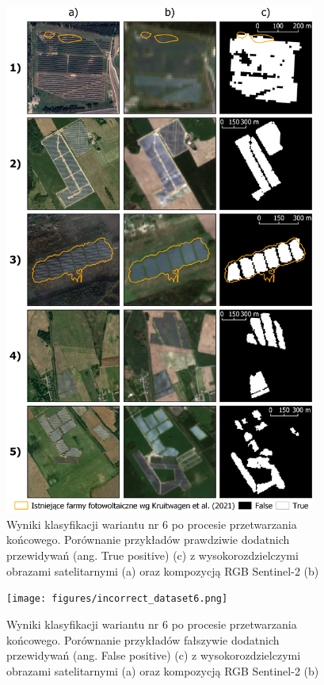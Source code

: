 \documentclass{amuthesis}
\begin{document}
\begin{figure}[t]

{\centering \includegraphics[width=0.91\textwidth,height=\textheight]{figures/pv_dataset6.png}

}

\caption{\label{fig-rycina-truepositive-dataset6}Wyniki klasyfikacji
wariantu nr 6 po procesie przetwarzania końcowego. Porównanie przykładów
prawdziwie dodatnich przewidywań (ang. True positive) (c) z
wysokorozdzielczymi obrazami satelitarnymi (a) oraz kompozycją RGB
Sentinel-2 (b)}

\end{figure}

\begin{figure}[t]

{\centering \texttt{[image: figures/incorrect\_dataset6.png]}

}

\caption{\label{fig-rycina-falsepositive-dataset6}Wyniki klasyfikacji
wariantu nr 6 po procesie przetwarzania końcowego. Porównanie przykładów
fałszywie dodatnich przewidywań (ang. False positive) (c) z
wysokorozdzielczymi obrazami satelitarnymi (a) oraz kompozycją RGB
Sentinel-2 (b)}

\end{figure}
\end{document}
